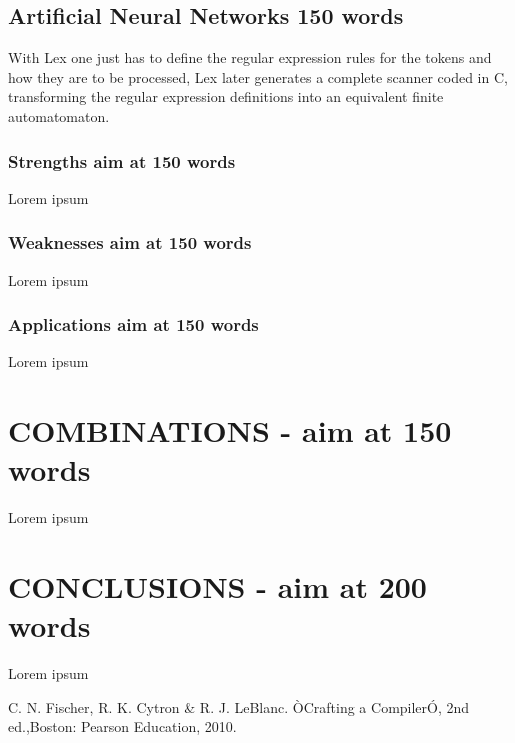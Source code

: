 \documentclass[letterpaper, 10 pt, conference]{ieeeconf}  %
\begin{document}
\subsection{Artificial Neural Networks 150 words}
With Lex one just has to define the regular expression rules for the tokens and how they are to be processed, Lex later generates a complete scanner coded in C, transforming the regular expression definitions into an equivalent finite automatomaton.

\subsubsection{Strengths aim at 150 words}
Lorem ipsum

\subsubsection{Weaknesses aim at 150 words}
Lorem ipsum

\subsubsection{Applications aim at 150 words}
Lorem ipsum


\section{COMBINATIONS - aim at 150 words}

Lorem ipsum

\section{CONCLUSIONS - aim at 200 words}

Lorem ipsum

\addtolength{\textheight}{-12cm}   %









\begin{thebibliography}{99}

 C. N. Fischer, R. K. Cytron \& R. J. LeBlanc. ÒCrafting a CompilerÓ, 2nd ed.,Boston: Pearson Education, 2010.

\end{thebibliography}
\end{document}
